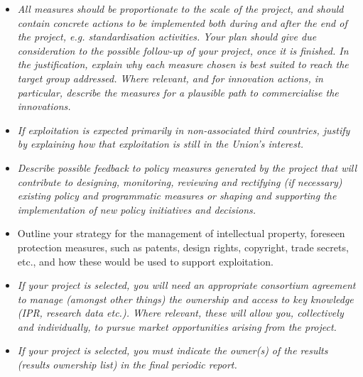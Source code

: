 \begin{itemize}
  \emph{\uline{Communication}}\footnote{footnote text,Schriftart: 9
    pt,Schriftart: 10 pt,Schriftart: 8 pt,WB-Fuß For further guidance on
    communicating EU research and innovation for project participants,
    please refer to the on the Funding \& Tenders Portal}\emph{ measures
  should promote the project throughout the full lifespan of the
  project. The aim is to inform and reach out to society and show the
  activities performed, and the use and the benefits the project will
  have for citizens. Activities must be strategically planned, with
  clear objectives, start at the outset and continue through the
  lifetime of the project. The description of the communication
  activities needs to state the main messages as well as the tools and
  channels that will be used to reach out to each of the chosen target
  groups.}
\item
  \emph{All measures should be proportionate to the scale of the
  project, and should contain concrete actions to be implemented both
  during and after the end of the project, e.g. standardisation
  activities. Your plan should give due consideration to the possible
  follow-up of your project, once it is finished. In the justification,
  explain why each measure chosen is best suited to reach the target
  group addressed. Where relevant, and for innovation actions, in
  particular, describe the measures for a plausible path to
  commercialise the innovations.}
\item
  \emph{If exploitation is expected primarily in non-associated third
  countries, justify by explaining how that exploitation is still in the
  Union's interest.}
\item
  \emph{Describe possible feedback to policy measures generated by the
  project that will contribute to designing, monitoring, reviewing and
  rectifying (if necessary) existing policy and programmatic measures or
  shaping and supporting the implementation of new policy initiatives
  and decisions.}
\end{itemize}

\begin{itemize}
\item
  Outline your strategy for the management of intellectual property,
  foreseen protection measures, such as patents, design rights,
  copyright, trade secrets, etc., and how these would be used to support
  exploitation.
\end{itemize}

\begin{itemize}
\item
  \emph{If your project is selected, you will need an appropriate
  consortium agreement to manage (amongst other things) the ownership
  and access to key knowledge (IPR, research data etc.). Where relevant,
  these will allow you, collectively and individually, to pursue market
  opportunities arising from the project.}
\item
  \emph{If your project is selected, you must indicate the owner(s) of
  the results (results ownership list) in the final periodic report.}
\end{itemize}

